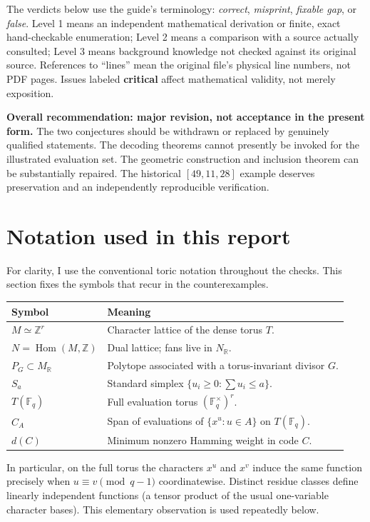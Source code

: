 \documentclass[12pt,letterpaper]{article}
\newcommand{\F}{\mathbb F}
\newcommand{\Z}{\mathbb Z}
\newcommand{\level}[1]{\textsf{Level #1}}
\begin{document}
The verdicts below use the guide's terminology: \emph{correct}, \emph{misprint}, \emph{fixable gap}, or \emph{false}.  \level{1} means an independent mathematical derivation or finite, exact hand-checkable enumeration; \level{2} means a comparison with a source actually consulted; \level{3} means background knowledge not checked against its original source.  References to ``lines'' mean the original file's physical line numbers, not PDF pages.  Issues labeled \textbf{critical} affect mathematical validity, not merely exposition.

\textbf{Overall recommendation: major revision, not acceptance in the present form.}  The two conjectures should be withdrawn or replaced by genuinely qualified statements.  The decoding theorems cannot presently be invoked for the illustrated evaluation set.  The geometric construction and inclusion theorem can be substantially repaired.  The historical $[49,11,28]$ example deserves preservation and an independently reproducible verification.

\section{Notation used in this report}\label{sec:notation}
For clarity, I use the conventional toric notation throughout the checks.  This section fixes the symbols that recur in the counterexamples.
\begin{center}
\begin{tabular}{@{}p{}p{}@{}}\toprule
Symbol & Meaning \\ \midrule
$M\simeq\Z^r$ & Character lattice of the dense torus $T$.\\
$N=\operatorname{Hom}(M,\Z)$ & Dual lattice; fans live in $N_{\mathbb R}$.\\
$P_G\subset M_{\mathbb R}$ & Polytope associated with a torus-invariant divisor $G$.\\
$S_a$ & Standard simplex $\{u_i\geq0:\sum u_i\leq a\}$.\\
$T(\F_q)$ & Full evaluation torus $(\F_q^\times)^r$.\\
$C_A$ & Span of evaluations of $\{x^u:u\in A\}$ on $T(\F_q)$.\\
$d(C)$ & Minimum nonzero Hamming weight in code $C$.\\
\bottomrule
\end{tabular}
\end{center}
In particular, on the full torus the characters $x^u$ and $x^v$ induce the same function precisely when $u\equiv v\pmod{q-1}$ coordinatewise.  Distinct residue classes define linearly independent functions (a tensor product of the usual one-variable character bases).  This elementary observation is used repeatedly below.
\end{document}
